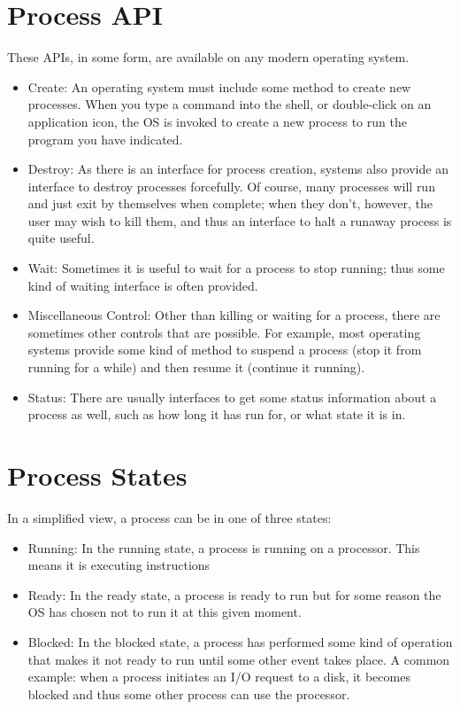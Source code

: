 \section*{Process API}
These APIs, in some form, are available on any modern operating system.
\begin{itemize}
\item Create: An operating system must include some method to create new processes. When you type a command into the shell, or double-click on an application icon, the OS is invoked to create a new process to run the program you have indicated.
\item Destroy: As there is an interface for process creation, systems also provide an interface to destroy processes forcefully. Of course, many processes will run and just exit by themselves when complete; when they don’t, however, the user may wish to kill them, and thus an interface to halt a runaway process is quite useful.
\item Wait: Sometimes it is useful to wait for a process to stop running; thus some kind of waiting interface is often provided.
\item Miscellaneous Control: Other than killing or waiting for a process, there are sometimes other controls that are possible. For example, most operating systems provide some kind of method to suspend a process (stop it from running for a while) and then resume it (continue it running).
\item Status: There are usually interfaces to get some status information about a process as well, such as how long it has run for, or what state it is in.
\end{itemize}
\section*{Process States}
In a simplified view, a process can be in one of three states:
\begin{itemize}
\item Running: In the running state, a process is running on a processor. This means it is executing instructions
\item Ready: In the ready state, a process is ready to run but for some reason the OS has chosen not to run it at this given moment.
\item Blocked: In the blocked state, a process has performed some kind of operation that makes it not ready to run until some other event takes place. A common example: when a process initiates an I/O request to a disk, it becomes blocked and thus some other process can use the processor.
\end{itemize}
